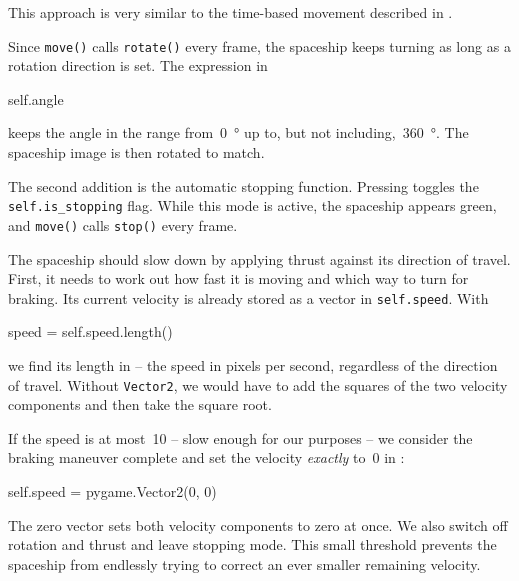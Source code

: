 \begin{hintbox}
	This approach is very similar to the time-based movement described in .
\end{hintbox}

Since \texttt{move()} calls \texttt{rotate()} every frame, the spaceship keeps turning as long as a rotation direction is set. The expression in 
\begin{codebox}
	self.angle %
\end{codebox}
keeps the angle in the range from~\SI{0}{\degree} up to, but not including,~\SI{360}{\degree}. The spaceship image is then rotated to match.


The second addition is the automatic stopping function. Pressing \keys{$\downarrow$} toggles the \texttt{self.is\_stopping} flag. While this mode is active, the spaceship appears green, and \texttt{move()} calls \texttt{stop()} every frame.


The spaceship should slow down by applying thrust against its direction of travel. First, it needs to work out how fast it is moving and which way to turn for braking. Its current velocity is already stored as a vector in \texttt{self.speed}. With
\begin{codebox}
	speed = self.speed.length()
\end{codebox}
we find its length in  -- the speed in pixels per second, regardless of the direction of travel. Without \texttt{Vector2}, we would have to add the squares of the two velocity components and then take the square root.

If the speed is at most~\SI{10}{\pxsec} -- slow enough for our purposes -- we consider the braking maneuver complete and set the velocity \emph{exactly} to~0 in :
\begin{codebox}
	self.speed = pygame.Vector2(0, 0)
\end{codebox}

The zero vector sets both velocity components to zero at once. We also switch off rotation and thrust and leave stopping mode. This small threshold prevents the spaceship from endlessly trying to correct an ever smaller remaining velocity.

